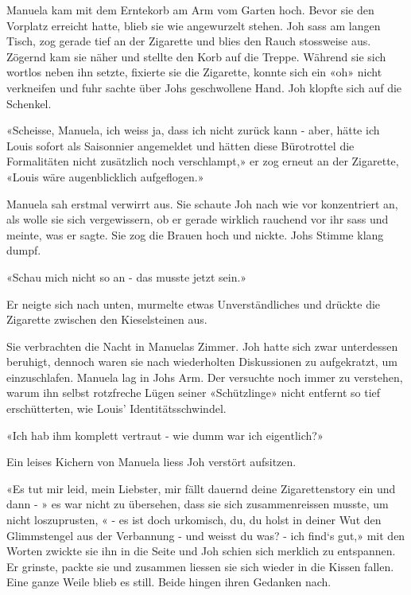 Manuela kam mit dem Erntekorb am Arm vom Garten hoch. Bevor sie den Vorplatz erreicht hatte, blieb sie wie angewurzelt stehen. Joh sass am langen Tisch, zog gerade tief an der Zigarette und blies den Rauch stossweise aus. Zögernd kam sie näher und stellte den Korb auf die Treppe. Während sie sich wortlos neben ihn setzte, fixierte sie die Zigarette, konnte sich ein «oh» nicht verkneifen und fuhr sachte über Johs geschwollene Hand. Joh klopfte sich auf die Schenkel.

«Scheisse, Manuela, ich weiss ja, dass ich nicht zurück kann - aber, hätte ich Louis sofort als Saisonnier angemeldet und hätten diese Bürotrottel die Formalitäten nicht zusätzlich noch verschlampt,» er zog erneut an der Zigarette, «Louis wäre augenblicklich aufgeflogen.»

Manuela sah erstmal verwirrt aus. Sie schaute Joh nach wie vor konzentriert an, als wolle sie sich vergewissern, ob er gerade wirklich rauchend vor ihr sass und meinte, was er sagte. Sie zog die Brauen hoch und nickte. Johs Stimme klang dumpf.

«Schau mich nicht so an - das musste jetzt sein.»

Er neigte sich nach unten, murmelte etwas Unverständliches und drückte die Zigarette zwischen den Kieselsteinen aus.

\sectionbreak 

Sie verbrachten die Nacht in Manuelas Zimmer. Joh hatte sich zwar unterdessen beruhigt, dennoch waren sie nach wiederholten Diskussionen zu aufgekratzt, um einzuschlafen. Manuela lag in Johs Arm. Der versuchte noch immer zu verstehen, warum ihn selbst rotzfreche Lügen seiner «Schützlinge» nicht entfernt so tief erschütterten, wie Louis’ Identitätsschwindel. 

«Ich hab ihm komplett vertraut - wie dumm war ich eigentlich?»

Ein leises Kichern von Manuela liess Joh verstört aufsitzen. 

«Es tut mir leid, mein Liebster, mir fällt dauernd deine Zigarettenstory ein und dann - » es war nicht zu übersehen, dass sie sich zusammenreissen musste, um nicht loszuprusten, « - es ist doch urkomisch, du, du holst in deiner Wut den Glimmstengel aus der Verbannung - und weisst du was? - ich find`s gut,» mit den Worten zwickte sie ihn in die Seite und Joh schien sich merklich zu entspannen. Er grinste, packte sie und zusammen liessen sie sich wieder in die Kissen fallen. Eine ganze Weile blieb es still. Beide hingen ihren Gedanken nach. 

